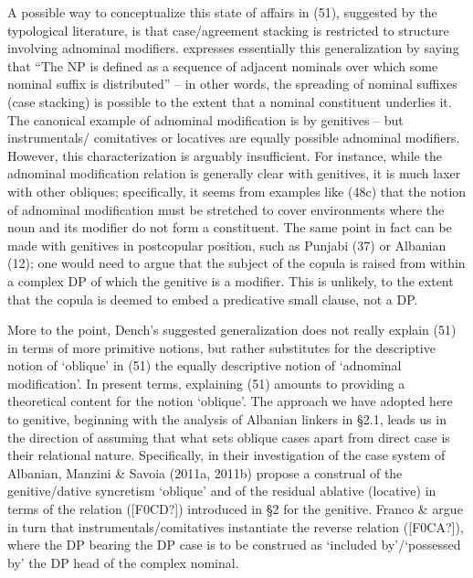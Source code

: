 \documentclass[output=paper]{langsci/langscibook}
\begin{document}
\begin{styleparagrafo}
A possible way to conceptualize this state of affairs in (51), suggested by the typological literature, is that case/agreement stacking is restricted to structure involving adnominal modifiers. \citet[386]{Dench1995} expresses essentially this generalization by saying that “The NP is defined as a sequence of adjacent nominals over which some nominal suffix is distributed” – in other words, the spreading of nominal suffixes (case stacking) is possible to the extent that a nominal constituent underlies it. The canonical example of adnominal modification is by genitives – but instrumentals/ comitatives or locatives are equally possible adnominal modifiers. However, this characterization is arguably insufficient. For instance, while the adnominal modification relation is generally clear with genitives, it is much laxer with other obliques; specifically, it seems from examples like (48c) that the notion of adnominal modification must be stretched to cover environments where the noun and its modifier do not form a constituent. The same point in fact can be made with genitives in postcopular position, such as Punjabi (37) or Albanian (12); one would need to argue that the subject of the copula is raised from within a complex DP of which the genitive is a modifier. This is unlikely, to the extent that the copula is deemed to embed a predicative small clause, not a DP.
\end{styleparagrafo}

\begin{styleparagrafo}
More to the point, Dench’s suggested generalization does not really explain (51) in terms of more primitive notions, but rather substitutes for the descriptive notion of ‘oblique’ in (51) the equally descriptive notion of ‘adnominal modification’. In present terms, explaining (51) amounts to providing a theoretical content for the notion ‘oblique’. The approach we have adopted here to genitive, beginning with the analysis of Albanian linkers in §2.1, leads us in the direction of assuming that what sets oblique cases apart from direct case is their relational nature. Specifically, in their investigation of the case system of Albanian, Manzini \& Savoia (2011a, 2011b) propose a construal of the genitive/dative syncretism ‘oblique’ and of the residual ablative (locative) in terms of the relation ([F0CD?]) introduced in §2 for the genitive. Franco \& \citet{Manzini2015} argue in turn that instrumentals/comitatives instantiate the reverse relation ([F0CA?]), where the DP bearing the DP case is to be construed as ‘included by’/‘possessed by’ the DP head of the complex nominal. 
\end{styleparagrafo}
\end{document}
